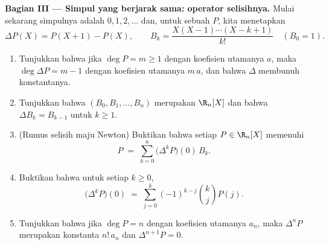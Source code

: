\begin{problem}
\medskip
\noindent\textbf{Bagian III --- Simpul yang berjarak sama: operator
selisihnya.} Mulai sekarang simpulnya adalah $0, 1, 2, \dots$ dan, untuk sebuah
 $P$, kita menetapkan
\[
\Delta P(X) = P(X + 1) - P(X),
\qquad
B_k = \frac{X(X-1)\cdots(X-k+1)}{k!} \quad (B_0 = 1).
\]
\begin{enumerate}[resume]
  \item Tunjukkan bahwa jika $\deg P = m \geq 1$ dengan koefisien utamanya
        $a$, maka $\deg \Delta P = m - 1$ dengan koefisien utamanya
        $m\,a$, dan bahwa $\Delta$ membunuh konstantanya.
  \item Tunjukkan bahwa $(B_0, B_1, \dots, B_n)$ merupakan 
        $\R_n[X]$ dan bahwa $\Delta B_k = B_{k-1}$ untuk $k \geq 1$.
  \item (Rumus selisih maju Newton) Buktikan bahwa setiap $P
        \in \R_n[X]$ memenuhi
        \[
        P \;=\; \sum_{k=0}^{n} \bigl(\Delta^{k} P\bigr)(0)\, B_k .
        \]
  \item Buktikan bahwa untuk setiap $k \geq 0$,
        \[
        \bigl(\Delta^{k} P\bigr)(0) \;=\;
        \sum_{j=0}^{k} (-1)^{k-j} \binom{k}{j} P(j) .
        \]
  \item Tunjukkan bahwa jika $\deg P = n$ dengan koefisien utamanya $a_n$,
        maka $\Delta^{n} P$ merupakan konstanta $n!\,a_n$ dan
        $\Delta^{n+1} P = 0$.
\end{enumerate}


\end{problem}
